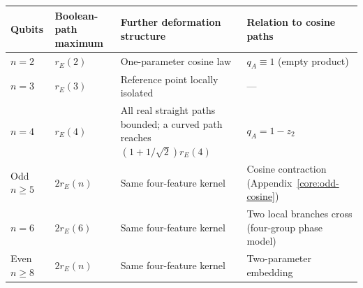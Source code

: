 \par
\onecolumngrid
\medskip
\noindent\begin{minipage}{\textwidth}
\label{tab:summary}
\setlength{\tabcolsep}{3pt}
\begin{tabular}{p{}p{}p{}p{}}
\toprule
Qubits & {\raggedright Boolean-path maximum\par} & {\raggedright Further deformation structure\par} & {\raggedright Relation to cosine paths\par}\\
\midrule
$n=2$ & $r_E(2)$ & {\raggedright One-parameter cosine law\par} & {\raggedright $q_A\equiv1$ (empty product)\par}\\
$n=3$ & $r_E(3)$ & {\raggedright Reference point locally isolated\par} & ---\\
$n=4$ & $r_E(4)$ & {\raggedright All real straight paths bounded; a curved path reaches $(1+1/\sqrt2)r_E(4)$\par} & $q_A=1-z_2$\\
Odd $n\ge5$ & $2r_E(n)$ & {\raggedright Same four-feature kernel\par} & {\raggedright Cosine contraction (Appendix~\ref{core:odd-cosine})\par}\\
$n=6$ & $2r_E(6)$ & {\raggedright Same four-feature kernel\par} & {\raggedright Two local branches cross (four-group phase model)\par}\\
Even $n\ge8$ & $2r_E(n)$ & {\raggedright Same four-feature kernel\par} & {\raggedright Two-parameter embedding\par}\\
\bottomrule
\end{tabular}
\end{minipage}
\par\medskip
\twocolumngrid
